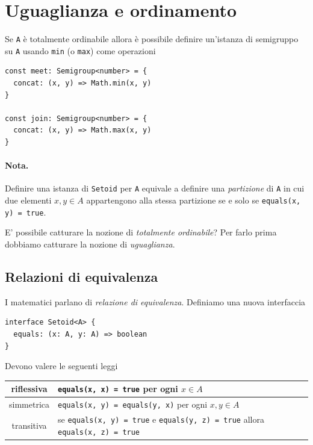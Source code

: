 \documentclass[12pt]{article}
\begin{document}
\section{Uguaglianza e ordinamento}

Se \texttt{A} è totalmente ordinabile allora è possibile definire un'istanza di semigruppo su \texttt{A}
usando \texttt{min} (o \texttt{max}) come operazioni

\begin{verbatim}
const meet: Semigroup<number> = {
  concat: (x, y) => Math.min(x, y)
}

const join: Semigroup<number> = {
  concat: (x, y) => Math.max(x, y)
}
\end{verbatim}

\paragraph{Nota. } Definire una istanza di \texttt{Setoid} per \texttt{A} equivale a definire una \emph{partizione} di \texttt{A} in cui due
elementi $x, y \in A$ appartengono alla stessa partizione se e solo se \texttt{equals(x, y) = true}.

E' possibile catturare la nozione di \emph{totalmente ordinabile}? Per farlo prima dobbiamo catturare la nozione di \emph{uguaglianza}.

\subsection{Relazioni di equivalenza}

I matematici parlano di \emph{relazione di equivalenza}.
Definiamo una nuova interfaccia

\begin{verbatim}
interface Setoid<A> {
  equals: (x: A, y: A) => boolean
}
\end{verbatim}

Devono valere le seguenti leggi

\begin{center}
\bgroup
\def\arraystretch{1.5}
\begin{tabular}{ |c|p{10cm}| }
\hline
riflessiva & \texttt{equals(x, x) = true} per ogni $x \in A$ \\
\hline
simmetrica & \texttt{equals(x, y) = equals(y, x)} per ogni $x, y \in A$ \\
\hline
transitiva & se \texttt{equals(x, y) = true} e \texttt{equals(y, z) = true} allora \texttt{equals(x, z) = true} \\
\hline
\end{tabular}
\egroup
\end{center}
\end{document}

